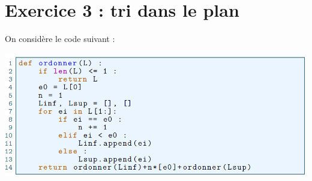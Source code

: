\section*{Exercice 3 : tri dans le plan}
On considère le code suivant :
\begin{center}
\includegraphics[scale=0.4]{ex6.png}
\end{center}
